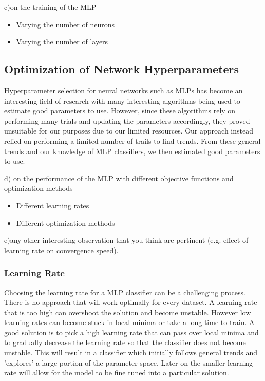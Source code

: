 c)on the training of the MLP
\begin{itemize}
   	\item Varying the number of neurons
	\item Varying the number of layers
\end{itemize}

\subsection{Optimization of Network Hyperparameters}\label{subsec:optNet}
Hyperparameter selection for neural networks such as MLPs has become an interesting field of research with many interesting algorithms being used to estimate good parameters to use\cite{bergstra2011algorithms}. However, since these algorithms rely on performing many trials and updating the parameters accordingly, they proved unsuitable for our purposes due to our limited resources. Our approach instead relied on performing a limited number of trails to find trends. From these general trends and our knowledge of MLP classifiers, we then estimated good parameters to use.


d) on the performance of the MLP with different objective functions and optimization methods
\begin{itemize}
   	\item Different learning rates

   	\item Different optimization methods
\end{itemize}
e)any other interesting observation that you think are pertinent (e.g. effect of learning rate on convergence speed).

\subsubsection{Learning Rate}

Choosing the learning rate for a MLP classifier can be a challenging process. There is no approach that will work optimally for every dataset. A learning rate that is too high can overshoot the solution and become unstable. However low learning rates can become stuck in local minima or take a long time to train. A good solution is to pick a high learning rate that can pass over local minima and  to gradually decrease the learning rate so that the classifier does not become unstable. This will result in a classifier which initially follows general trends and 'explores' a large portion of the parameter space. Later on the smaller learning rate will allow for the model to be fine tuned into a particular solution.

